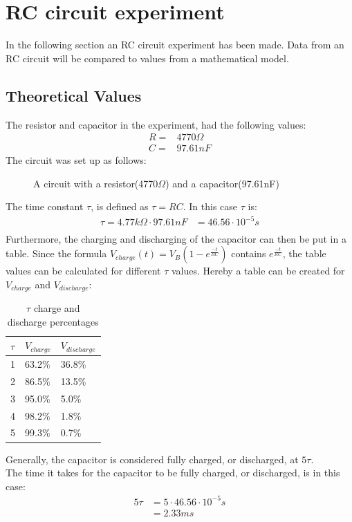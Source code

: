 \section{RC circuit experiment}
In the following section an RC circuit experiment has been made. Data from an RC circuit will be compared to values from a mathematical model.
\subsection{Theoretical Values}
The resistor and capacitor in the experiment, had the following values:
\begin{align*}
 R =& 4770\Omega \\
 C =& 97.61nF
\end{align*}
The circuit was set up as follows:
\begin{figure}[H]
	
	\caption{A circuit with a resistor(4770$\Omega$) and a capacitor(97.61nF)}
\end{figure}
\noindent The time constant $\tau$, is defined as $\tau = RC$. In this case $\tau$ is:
\begin{align*}
	\tau = 4.77 k\Omega \cdot 97.61 nF &= 46.56 \cdot 10^{-5} s \\
\end{align*}
Furthermore, the charging and discharging of the capacitor can then be put in a table. Since the formula $V_{charge}(t)=V_B(1-e^{\frac{-t}{RC}})$ contains $e^{\frac{-t}{RC}}$, the table values can be calculated for different $\tau$ values. Hereby a table can be created for $V_{charge}$ and $V_{discharge}$:
\begin{table}[H]
\center
\begin{tabular}{|l|l|l|}
\hline
$\tau$ & $V_{charge}$ & $V_{discharge}$ \\ \hline
1      & 63.2\%       & 36.8\%         \\ \hline
2      & 86.5\%       & 13.5\%         \\ \hline
3      & 95.0\%       & 5.0\%          \\ \hline
4      & 98.2\%       & 1.8\%          \\ \hline
5      & 99.3\%       & 0.7\%          \\ \hline
\end{tabular}
\caption{$\tau$ charge and discharge percentages}
\end{table}
\noindent Generally, the capacitor is considered fully charged, or discharged, at $5\tau$. \\
The time it takes for the capacitor to be fully charged, or discharged, is in this case:
\begin{align*}
5\tau &= 5 \cdot 46.56 \cdot 10^{-5} s \\
&= 2.33 ms
\end{align*}
